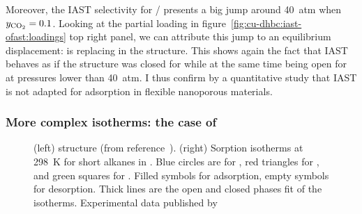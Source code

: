 \documentclass[thesis]{subfiles}
\begin{document}
Moreover, the IAST selectivity for / presents a big jump around
\SI{40}{atm} when $y_{\ce{CO2}} = 0.1$. Looking at the partial loading in
figure~\ref{fig:cu-dhbc:iast-ofast:loadings} top right panel, we can attribute
this jump to an equilibrium displacement:  is replacing  in the
structure. This shows again the fact that IAST behaves as if the structure was
closed for  while at the same time being open for  at pressures
lower than \SI{40}{atm}. I thus confirm by a quantitative study that IAST is not
adapted for adsorption in flexible nanoporous materials.

\FloatBarrier
\subsubsection{More complex isotherms: the case of \RPMZn}

\begin{figure}[htp]
    \centering
    \hfill
    \raisebox{-0.5\height}{}
    \caption{(left) \RPMZn structure (from reference~\cite{Lan2009-2}).
    (right) Sorption isotherms at \SI{298}{K} for short
    alkanes in \RPMZn. Blue circles are for , red triangles for
    , and green squares for . Filled symbols for adsorption,
    empty symbols for desorption. Thick lines are the open and closed phases fit
    of the isotherms. Experimental data published by
    \citeauthor{Nijem2012}\cite{Nijem2012}}
    \label{fig:rpm3-zn}
\end{figure}
\end{document}
